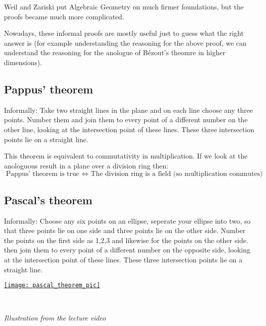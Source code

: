 Weil and Zariski put Algebraic Geometry on much firmer foundations, but the proofs became much more complicated. 

Nowadays, these informal proofs are mostly useful just to guess what the right answer is (for example understanding the reasoning for the above proof, we can understand the reasoning for 
the anologue of Bézout's theomre in higher dimensions).


\subsection{Pappus' theorem}

\begin{theorem}
    Informally: Take two straight lines in the plane and on each line choose any three points.
Number them and join them to every point of a different number on the other line, looking at the intersection point of these lines.
These three intersection points lie on a straight line.
\end{theorem}

This theorem is equivalent to commutativity in multiplication. If we look at the anologuous result in a plane over a division ring then:\begin{equation*}
    \text{Pappus' theorem is true }\iff \text{ The division ring is a field (so multiplication commutes)}
\end{equation*}

\subsection{Pascal's theorem}
\begin{theorem}
    Informally: Choose any six points on an ellipse, seperate your ellipse into two, so that three points lie on one side and three points lie on the other side. Number the points on the first side as 1,2,3 and likewise for the points on the other side. 
    then join them to every point of a different number on the opposite side, looking at the intersection point of these lines.
    These three intersection points lie on a straight line.
\end{theorem}

    \href{https://youtu.be/-9qugwEZDJs?t=955}{\texttt{[image: pascal\_theorem\_pic]}}

    \

    \textit{Illustration from the lecture video}

    \

